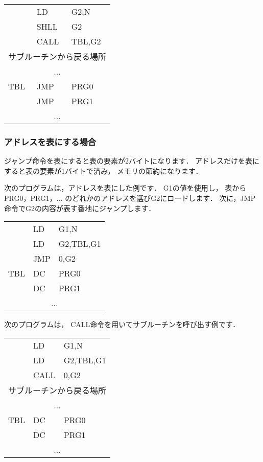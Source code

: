 {\small\tt\begin{center}
\begin{tabular}{l l l}
    & LD    & G2,N   \\
    & SHLL  & G2     \\
    & CALL  & TBL,G2 \\
\multicolumn{3}{c}{サブルーチンから戻る場所} \\
\multicolumn{3}{c}{...} \\
TBL & JMP   & PRG0   \\
    & JMP   & PRG1   \\
\multicolumn{3}{c}{...} \\
\end{tabular}
\end{center}}

\subsubsection{アドレスを表にする場合}
ジャンプ命令を表にすると表の要素が2バイトになります．
アドレスだけを表にすると表の要素が1バイトで済み，
メモリの節約になります．

次のプログラムは，アドレスを表にした例です．
G1の値を使用し，
表からPRG0，PRG1，... のどれかのアドレスを選びG2にロードします．
次に，JMP命令でG2の内容が表す番地にジャンプします．

{\small\tt\begin{center}
\begin{tabular}{l l l}
    & LD    & G1,N      \\
    & LD    & G2,TBL,G1 \\
    & JMP   & 0,G2      \\
TBL & DC    & PRG0      \\
    & DC    & PRG1      \\
\multicolumn{3}{c}{...} \\
\end{tabular}
\end{center}}

次のプログラムは，
CALL命令を用いてサブルーチンを呼び出す例です．

{\small\tt\begin{center}
\begin{tabular}{l l l}
    & LD    & G1,N      \\
    & LD    & G2,TBL,G1 \\
    & CALL  & 0,G2      \\
\multicolumn{3}{c}{サブルーチンから戻る場所} \\
\multicolumn{3}{c}{...} \\
TBL & DC    & PRG0   \\
    & DC    & PRG1   \\
\multicolumn{3}{c}{...} \\
\end{tabular}
\end{center}}

